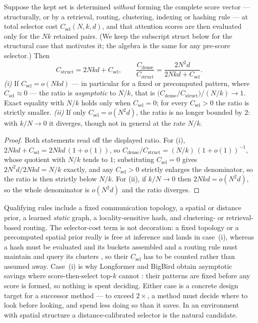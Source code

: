\begin{proposition}[Escape]
\label{prop:escape}
Suppose the kept set is determined \emph{without} forming the complete score
vector --- structurally, or by a retrieval, routing, clustering, indexing or
hashing rule --- at total selector cost $C_{\mathrm{sel}}(N,k,d)$, and that
attention scores are then evaluated only for the $Nk$ retained pairs. (We keep
the subscript $\mathrm{struct}$ below for the structural case that motivates
it; the algebra is the same for any pre-score selector.) Then
\begin{equation}
C_{\mathrm{struct}} = 2Nkd + C_{\mathrm{sel}},
\qquad
\frac{C_{\text{dense}}}{C_{\mathrm{struct}}}
  = \frac{2N^2 d}{2Nkd + C_{\mathrm{sel}}}.
\end{equation}
\emph{(i)} If $C_{\mathrm{sel}} = o(Nkd)$ --- in particular for a fixed or
precomputed pattern, where $C_{\mathrm{sel}} \approx 0$ --- the ratio is
\emph{asymptotic} to $N/k$, that is
$\bigl(C_{\text{dense}}/C_{\mathrm{struct}}\bigr)\big/(N/k) \to 1$. Exact
equality with $N/k$ holds only when $C_{\mathrm{sel}} = 0$; for every
$C_{\mathrm{sel}} > 0$ the ratio is strictly smaller. \emph{(ii)} If only
$C_{\mathrm{sel}} = o(N^2 d)$, the ratio is no longer bounded by $2$: with
$k/N \to 0$ it diverges, though not in general at the rate $N/k$.
\end{proposition}

\begin{proof}
Both statements read off the displayed ratio. For (i), $2Nkd + C_{\mathrm{sel}}
= 2Nkd\,(1+o(1))$, so
$C_{\text{dense}}/C_{\mathrm{struct}} = (N/k)\,(1+o(1))^{-1}$, whose quotient
with $N/k$ tends to $1$; substituting $C_{\mathrm{sel}} = 0$ gives
$2N^2 d/2Nkd = N/k$ exactly, and any $C_{\mathrm{sel}} > 0$ strictly enlarges
the denominator, so the ratio is then strictly below $N/k$. For (ii), if
$k/N \to 0$ then $2Nkd = o(N^2 d)$, so the whole denominator is $o(N^2 d)$ and
the ratio diverges.
\end{proof}

Qualifying rules include a fixed communication topology, a spatial or distance
prior, a learned \emph{static} graph, a locality-sensitive hash, and
clustering- or retrieval-based routing. The selector-cost term is not
decoration: a fixed topology or a precomputed spatial prior really is free at
inference and lands in case~(i), whereas a hash must be evaluated and its
buckets assembled \citep{kitaev2020reformer} and a routing rule must maintain
and query its clusters \citep{roy2021routing}, so their $C_{\mathrm{sel}}$ has
to be counted rather than assumed away. Case~(i) is why Longformer and BigBird
obtain asymptotic savings where score-then-select top-$k$ cannot
\citep{beltagy2020longformer,zaheer2020bigbird}: their patterns are fixed
before any score is formed, so nothing is spent deciding. Either case is a
concrete design target for a successor method --- to exceed $2\times$, a method
must decide where to look before looking, and spend less doing so than it
saves. In an environment with spatial structure a distance-calibrated selector
is the natural candidate.

